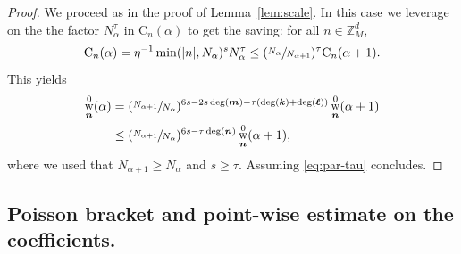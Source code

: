 \documentclass[JEP,XML,SOM,Unicode,published]{cedram}
\DeclareMathOperator{\rw}{w}
\theoremstyle{plain}
\theoremstyle{definition}
\newcommand{\nb}{{\boldsymbol n}}
\newcommand{\kb}{{\boldsymbol k}}
\newcommand{\lb}{{\boldsymbol \ell}}
\newcommand{\mb}{{\boldsymbol m}}
\newcommand{\Z}{\mathbb{Z}}
\newcommand{\1}{\mathbf{1}}
\begin{document}
\begin{proof}
We proceed as in the proof of Lemma~\ref{lem:scale}. In this case we leverage on the the factor $N_{\alpha}^{\tau}$ in $\mathrm{C}_{n}(\alpha)$ to get the saving: for all $n\in\Z_{M}^{d}$,
\[
\mathrm{C}_{n}(\alpha) = \eta^{-1}\min(|n|, N_{\alpha})^{s}N_{\alpha}^{\tau} \leq (\sfrac{N_{\alpha}}{N_{\alpha+1}})^{\tau}\mathrm{C}_{n}(\alpha+1).
\]
This yields
\begin{align*}
\rw_{\nb}^{0}(\alpha)
&= (\sfrac{N_{\alpha+1}}{N_{\alpha}})^{6s - 2s\deg(\mb)-\tau(\deg(\kb)+\deg(\lb))} \rw_{\nb}^{0}(\alpha+1)\\
&\leq (\sfrac{N_{\alpha+1}}{N_{\alpha}})^{6s-\tau\deg(\nb)} \rw_{\nb}^{0}(\alpha+1),
\end{align*}
where we used that $N_{\alpha+1}\geq N_{\alpha}$ and $s\geq\tau$. Assuming \eqref{eq:par-tau} concludes.
\end{proof}

\subsection{Poisson bracket and point-wise estimate on the coefficients. }
\label{sec:poiss}
\end{document}
